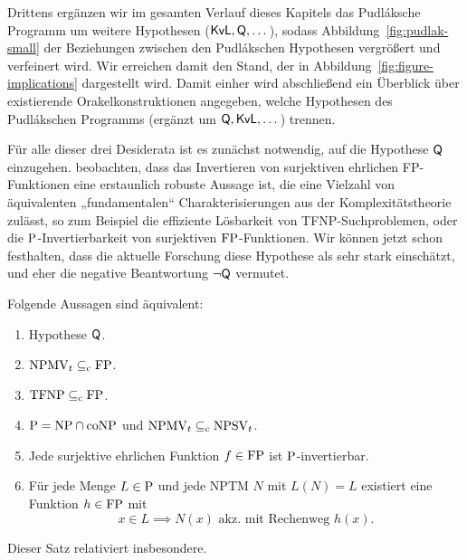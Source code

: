 
Drittens ergänzen wir im gesamten Verlauf dieses Kapitels das Pudláksche Programm um weitere Hypothesen ($\mathsf{KvL}, \hQ, \dots$), sodass Abbildung~\ref{fig:pudlak-small} der Beziehungen zwischen den Pudlákschen Hypothesen vergrößert und verfeinert wird. Wir erreichen damit den Stand, der in Abbildung~\ref{fig:figure-implications} dargestellt wird.
Damit einher wird abschließend ein Überblick über existierende Orakelkonstruktionen angegeben, welche Hypothesen des Pudlákschen Programms (ergänzt um $\hQ, \mathsf{KvL}, \dots$) trennen.


Für alle dieser drei Desiderata ist es zunächst notwendig, auf die Hypothese $\hQ$ einzugehen.
\textcite{fenner_inverting_2003} beobachten, dass das Invertieren von surjektiven ehrlichen FP-Funktionen eine erstaunlich robuste Aussage ist, die eine Vielzahl von äquivalenten „fundamentalen“ \parencite[91]{fenner_inverting_2003} Charakterisierungen aus der Komplexitätstheorie zulässt, so zum Beispiel die effiziente Lösbarkeit von TFNP-Suchproblemen, oder die $\P$-Invertierbarkeit von surjektiven $\FP$-Funktionen. Wir können jetzt schon festhalten, dass die aktuelle Forschung diese Hypothese als sehr stark einschätzt, und eher die negative Beantwortung $\neg\hQ$ vermutet.


\begin{theorem}\label{thm:q-orig}
    Folgende Aussagen sind äquivalent:
    \begin{enumerate}
        \item Hypothese $\hQ$.
        \item $\mathrm{NPMV}_t\subseteqc \mathrm{FP}$.
        \item $\TFNP\subseteqc \mathrm{FP}$.
        \item $\P=\NP\cap\coNP$ und $\mathrm{NPMV}_t\subseteqc \mathrm{NPSV}_t$.
        \item Jede surjektive ehrlichen Funktion $f\in\FP$ ist $\P$-invertierbar.
        \item Für jede Menge $L\in \P$  und jede NPTM $N$ mit $L(N)=L$ existiert eine Funktion $h\in \FP$ mit 
            \[ x\in L \implies N(x) \text{ akz. mit Rechenweg $h(x)$}. \]
    \end{enumerate}
\end{theorem}
Dieser Satz relativiert insbesondere.

